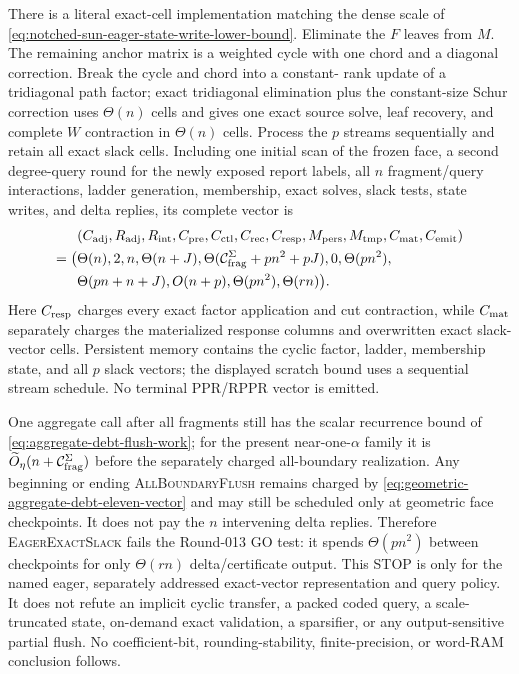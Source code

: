 \begin{proposition}
There is a literal exact-cell implementation matching the dense scale of
\cref{eq:notched-sun-eager-state-write-lower-bound}.  Eliminate the $F$
leaves from $M$.  The remaining anchor matrix is a weighted cycle with one
chord and a diagonal correction.  Break the cycle and chord into a constant-
rank update of a tridiagonal path factor; exact tridiagonal elimination plus
the constant-size Schur correction uses $\Theta(n)$ cells and gives one exact
source solve, leaf recovery, and complete $W$ contraction in $\Theta(n)$
cells.  Process the $p$ streams sequentially and retain all exact slack cells.
Including one initial scan of the frozen face, a second degree-query round for
the newly exposed report labels, all $n$ fragment/query interactions, ladder
generation, membership, exact solves, slack tests, state writes, and delta
replies, its complete vector is
\begin{equation}
 \begin{aligned}
 &(C_{\rm adj},R_{\rm adj},R_{\rm int},C_{\rm pre},C_{\rm ctl},C_{\rm rec},
 C_{\rm resp},M_{\rm pers},M_{\rm tmp},C_{\rm mat},C_{\rm emit})\\
 =\bigl(&\Theta(n),2,n,\Theta(n+J),
 \Theta(\mathcal C_{\rm frag}^{\Sigma}+pn^2+pJ),0,
 \Theta(pn^2),\\
 &\Theta(pn+n+J),O(n+p),\Theta(pn^2),\Theta(rn)\bigr).
 \end{aligned}
 \label{eq:notched-sun-eager-eleven-vector}
\end{equation}
Here $C_{\rm resp}$ charges every exact factor application and cut
contraction, while $C_{\rm mat}$ separately charges the materialized response
columns and overwritten exact slack-vector cells.  Persistent memory contains
the cyclic factor, ladder, membership state, and all $p$ slack vectors; the
displayed scratch bound uses a sequential stream schedule.  No terminal
PPR/RPPR vector is emitted.

One aggregate call after all fragments still has the scalar recurrence bound
of \cref{eq:aggregate-debt-flush-work}; for the present near-one-$\alpha$
family it is $\widetilde O_\eta(n+\mathcal C_{\rm frag}^{\Sigma})$ before the
separately charged all-boundary realization.  Any beginning or ending
\textsc{AllBoundaryFlush} remains charged by
\cref{eq:geometric-aggregate-debt-eleven-vector} and may still be scheduled
only at geometric face checkpoints.  It does not pay the $n$ intervening
delta replies.  Therefore \textsc{EagerExactSlack} fails the Round-013 GO
test: it spends $\Theta(pn^2)$ between checkpoints for only $\Theta(rn)$
delta/certificate output.  This STOP is only for the named eager, separately
addressed exact-vector representation and query policy.  It does not refute
an implicit cyclic transfer, a packed coded query, a scale-truncated state,
on-demand exact validation, a sparsifier, or any output-sensitive partial
flush.  No coefficient-bit, rounding-stability, finite-precision, or word-RAM
conclusion follows.
\end{proposition}

